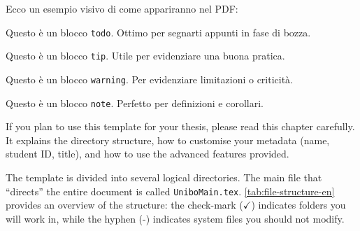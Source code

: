 {	Ecco un esempio visivo di come appariranno nel PDF:
	
	\vspace{.875em}
	\begin{tcbraster}[
		raster columns=2,
		raster equal height,
		nobeforeafter,
		raster column skip=1cm
		]
		\begin{block}[todo]
			Questo è un blocco \texttt{todo}. Ottimo per segnarti appunti in fase di bozza.
		\end{block}
		\begin{block}[tip]
			Questo è un blocco \texttt{tip}. Utile per evidenziare una buona pratica.
		\end{block}
	\end{tcbraster}
	
	\begin{tcbraster}[
		raster columns=2,
		raster equal height,
		nobeforeafter,
		raster column skip=1cm
		]
		\begin{block}[warning]
			Questo è un blocco \texttt{warning}. Per evidenziare limitazioni o criticità.
		\end{block}
		\begin{block}[note]
			Questo è un blocco \texttt{note}. Perfetto per definizioni e corollari.
		\end{block}
	\end{tcbraster}
	\vspace{.875em}
	
}{%
	If you plan to use this template for your thesis, please read this chapter carefully. It explains the directory structure, how to customise your metadata (name, student ID, title), and how to use the advanced features provided.
	
	The template is divided into several logical directories. The main file that ``directs'' the entire document is called \texttt{UniboMain.tex}. \autoref{tab:file-structure-en} provides an overview of the structure: the check-mark ($\checkmark$) indicates folders you will work in, while the hyphen (-) indicates system files you should not modify.
	
}
